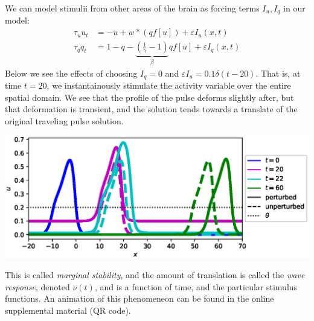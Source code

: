 \documentclass[landscape,final]{baposter}
\begin{document}
\begin{poster}
{	We can model stimulii from other areas of the brain as forcing terms $I_u, I_q$ in our model:
	\begin{align*}
		\tau_u u_t &= -u + w * (q f[u]) + \varepsilon I_u(x, t)\\
		\tau_q q_t &= 1 - q - \underbrace{(\tfrac{1}{\gamma} - 1)}_{\beta} q f[u] + \varepsilon I_q(x, t)
	\end{align*}
	Below we see the effects of choosing $I_q = 0$ and $\varepsilon I_u = 0.1 \delta(t-20)$. That is, at time $t=20$, we instantainously stimulate the activity variable over the entire spatial domain. We see that the profile of the pulse deforms slightly after, but that deformation is transient, and the solution tends towards a translate of the original traveling pulse solution. 
	\begin{center}
		\includegraphics[width=.7\linewidth]{response_example}
	\end{center}
	This is called \textit{marginal stability}, and the amount of translation is called the \textit{wave response}, denoted $\nu(t)$, and is a function of time, and the particular stimulus functions. An animation of this phenomeneon can be found in the online supplemental material (QR code).
	\vspace{.2cm}
}


\end{poster}
\end{document}
